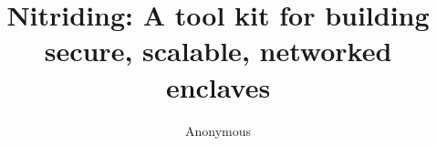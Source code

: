 \documentclass[letterpaper,twocolumn,10pt]{article}
\begin{document}
\title{\Large \bf Nitriding: A tool kit for building\\secure, scalable, networked enclaves}

\author{Anonymous}

\maketitle












\balance
\printbibliography
\end{document}

